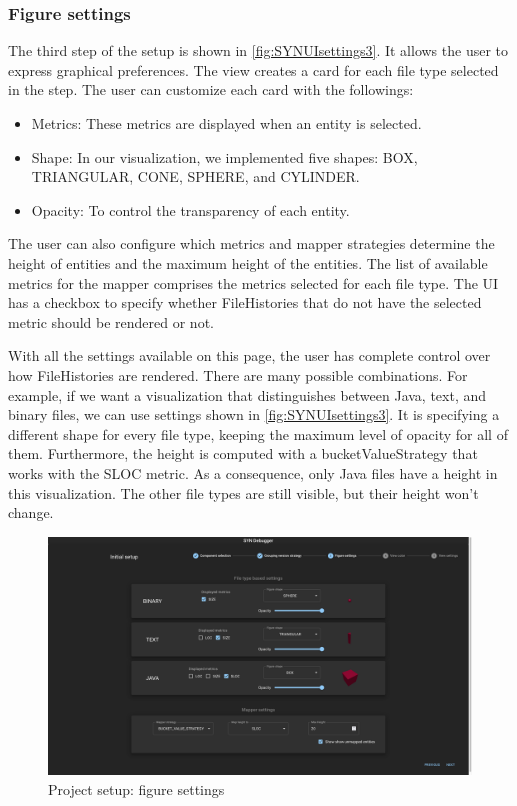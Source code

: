 \subsubsection*{Figure settings}
The third step of the setup is shown in \autoref{fig:SYNUIsettings3}. It allows the user to express graphical preferences. 
The view creates a card for each file type selected in the  step.
The user can customize each card with the followings:
\begin{itemize}
    \item Metrics: These metrics are displayed when an entity is selected.
    \item Shape: In our visualization, we implemented five shapes: BOX, TRIANGULAR, CONE, SPHERE, and CYLINDER. 
    \item Opacity: To control the transparency of each entity.
\end{itemize}

The user can also configure which metrics and mapper strategies determine the height of entities and the maximum height of the entities. 
The list of available metrics for the mapper comprises the metrics selected for each file type.
The UI has a checkbox to specify whether FileHistories that do not have the selected metric should be rendered or not. 

With all the settings available on this page, the user has complete control over how FileHistories are rendered. 
There are many possible combinations. For example, if we want a visualization that distinguishes between Java, text, and binary files, we can use settings shown in \autoref{fig:SYNUIsettings3}. It is specifying a different shape for every file type, keeping the maximum level of opacity for all of them. Furthermore, the height is computed with a bucketValueStrategy that works with the SLOC metric. As a consequence, only Java files have a height in this visualization. The other file types are still visible, but their height won't change. 

\begin{figure}
    \center
    \includegraphics[width=\textwidth]{SYNUI-settings3.png}
    \caption{Project setup: figure settings}
    \label{fig:SYNUIsettings3}
\end{figure}

